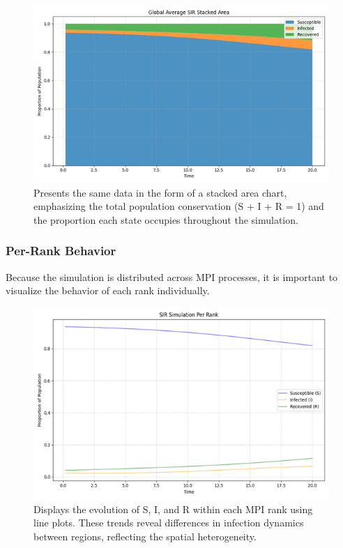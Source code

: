\begin{figure}[H]
    \centering
    \includegraphics[width=14cm]{Images/pic6.png}
    \caption*{Presents the same data in the form of a stacked area chart, emphasizing the total population conservation (S + I + R = 1) and the proportion each state occupies throughout the simulation.}
    \label{fig:pic6}
\end{figure}


\subsubsection{Per-Rank Behavior}
Because the simulation is distributed across MPI processes, it is important to visualize the behavior of each rank individually.
\begin{figure}[H]
    \centering
    \includegraphics[width=14cm]{Images/pic7.png}
    \caption*{Displays the evolution of S, I, and R within each MPI rank using line plots. These trends reveal differences in infection dynamics between regions, reflecting the spatial heterogeneity.}
    \label{fig:sir_line_plot}
\end{figure}

